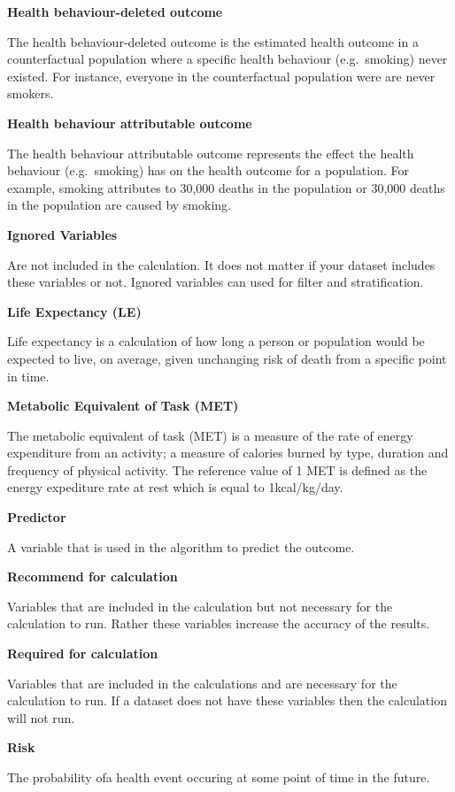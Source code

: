 \documentclass[]{book}
\begin{document}
\textbf{Health behaviour-deleted outcome}

The health behaviour-deleted outcome is the estimated health outcome in
a counterfactual population where a specific health behaviour
(e.g.~smoking) never existed. For instance, everyone in the
counterfactual population were are never smokers.

\textbf{Health behaviour attributable outcome}

The health behaviour attributable outcome represents the effect the
health behaviour (e.g.~smoking) has on the health outcome for a
population. For example, smoking attributes to 30,000 deaths in the
population or 30,000 deaths in the population are caused by smoking.

\textbf{Ignored Variables}

Are not included in the calculation. It does not matter if your dataset
includes these variables or not. Ignored variables can used for filter
and stratification.

\textbf{Life Expectancy (LE)}

Life expectancy is a calculation of how long a person or
population would be expected to live, on average, given unchanging risk
of death from a specific point in time.

\textbf{Metabolic Equivalent of Task (MET)}

The metabolic equivalent of task (MET) is a measure of the rate of
energy expenditure from an activity; a measure of calories burned by
type, duration and frequency of physical activity. The reference value
of 1 MET is defined as the energy expediture rate at rest which is equal
to 1kcal/kg/day.

\textbf{Predictor}

A variable that is used in the algorithm to predict the outcome.

\textbf{Recommend for calculation}

Variables that are included in the calculation but not necessary for the
calculation to run. Rather these variables increase the accuracy of the
results.

\textbf{Required for calculation}

Variables that are included in the calculations and are necessary for
the calculation to run. If a dataset does not have these variables then
the calculation will not run.

\textbf{Risk}

The probability ofa health event occuring at some point of time in the
future.
\end{document}
